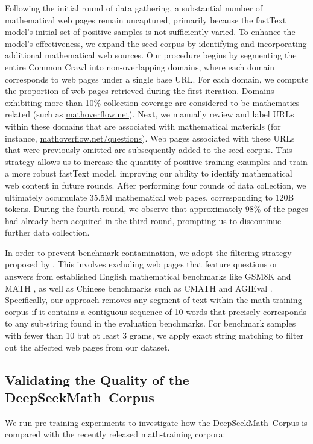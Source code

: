 \begin{itemize}[topsep=0pt]
Following the initial round of data gathering, a substantial number of mathematical web pages remain uncaptured, primarily because the fastText model’s initial set of positive samples is not sufficiently varied. To enhance the model’s effectiveness, we expand the seed corpus by identifying and incorporating additional mathematical web sources. Our procedure begins by segmenting the entire Common Crawl into non-overlapping domains, where each domain corresponds to web pages under a single base URL. For each domain, we compute the proportion of web pages retrieved during the first iteration. Domains exhibiting more than 10\% collection coverage are considered to be mathematics-related (such as \url{mathoverflow.net}). Next, we manually review and label URLs within these domains that are associated with mathematical materials (for instance, \url{mathoverflow.net/questions}). Web pages associated with these URLs that were previously omitted are subsequently added to the seed corpus. This strategy allows us to increase the quantity of positive training examples and train a more robust fastText model, improving our ability to identify mathematical web content in future rounds. After performing four rounds of data collection, we ultimately accumulate 35.5M mathematical web pages, corresponding to 120B tokens. During the fourth round, we observe that approximately 98\% of the pages had already been acquired in the third round, prompting us to discontinue further data collection.

In order to prevent benchmark contamination, we adopt the filtering strategy proposed by \cite{deepseek-coder}. This involves excluding web pages that feature questions or answers from established English mathematical benchmarks like GSM8K \citep{gsm8k} and MATH \citep{MATH}, as well as Chinese benchmarks such as CMATH \citep{wei2023cmath} and AGIEval \citep{agieval}. Specifically, our approach removes any segment of text within the math training corpus if it contains a contiguous sequence of 10 words that precisely corresponds to any sub-string found in the evaluation benchmarks. For benchmark samples with fewer than 10 but at least 3 grams, we apply exact string matching to filter out the affected web pages from our dataset.

\subsection{Validating the Quality of the DeepSeekMath~Corpus}

We run pre-training experiments to investigate how the DeepSeekMath~Corpus is compared with the recently released math-training corpora:


\end{itemize}
